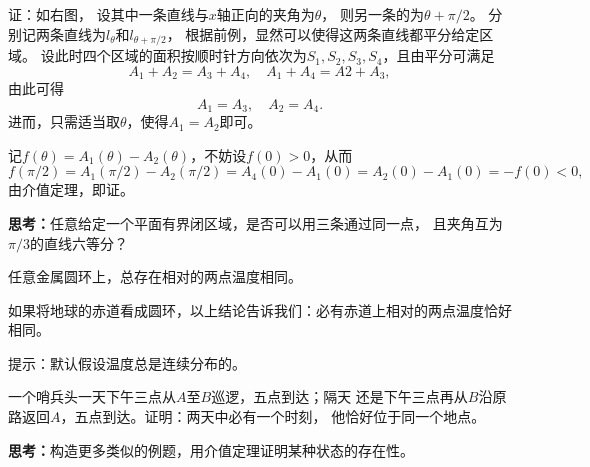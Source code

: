 \begin{shaded}
证：如右图，
设其中一条直线与$x$轴正向的夹角为$\theta$，
则另一条的为$\theta+\pi/2$。
分别记两条直线为$l_{\theta}$和$l_{\theta+\pi/2}$，
根据前例，显然可以使得这两条直线都平分给定区域。
设此时四个区域的面积按顺时针方向依次为$S_1,S_2,S_3,S_4$，且由平分可满足
$$A_1+A_2=A_3+A_4,\quad A_1+A_4=A2+A_3,$$
由此可得
$$A_1=A_3,\quad A_2=A_4.$$
进而，只需适当取$\theta$，使得$A_1=A_2$即可。

记$f(\theta)=A_1(\theta)-A_2(\theta)$，不妨设$f(0)>0$，从而
$$f(\pi/2)=A_1(\pi/2)-A_2(\pi/2)=A_4(0)-A_1(0)=A_2(0)-A_1(0)=-f(0)<0,$$
由介值定理，即证。\fin

{\bf 思考：}任意给定一个平面有界闭区域，是否可以用三条通过同一点，
且夹角互为$\pi/3$的直线六等分？

\bs 
\egz 任意金属圆环上，总存在相对的两点温度相同。

如果将地球的赤道看成圆环，以上结论告诉我们：必有赤道上相对的两点温度恰好相同。

提示：默认假设温度总是连续分布的。

\bs
\egz 一个哨兵头一天下午三点从$A$至$B$巡逻，五点到达；隔天
还是下午三点再从$B$沿原路返回$A$，五点到达。证明：两天中必有一个时刻，
他恰好位于同一个地点。

\bs
{\bf 思考：}构造更多类似的例题，用介值定理证明某种状态的存在性。

\end{shaded}

